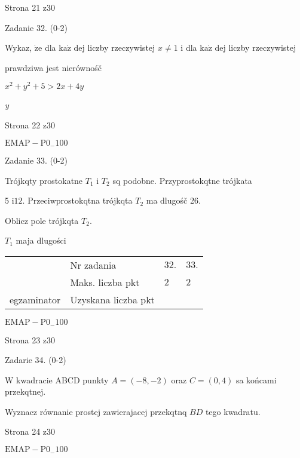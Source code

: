\documentclass[a4paper,12pt]{article}
\begin{document}
Strona 21 z30





Zadanie 32. (0-2)

Wykaz, $\dot{\mathrm{z}}\mathrm{e}$ dla $\mathrm{k}\mathrm{a}\dot{\mathrm{z}}$ dej liczby rzeczywistej $x\neq 1$ i dla $\mathrm{k}\mathrm{a}\dot{\mathrm{z}}$ dej liczby rzeczywistej

prawdziwa jest nierównośč

$x^{2}+y^{2}+5>2x+4y$

{\it y}

Strona 22 z30

$\mathrm{E}\mathrm{M}\mathrm{A}\mathrm{P}-\mathrm{P}0_{-}100$





Zadanie 33. (0-2)

Trójkqty prostokatne $T_{1}$ i $T_{2}$ sq podobne. Przyprostokqtne trójkata

5 $\mathrm{i} 12$. Przeciwprostokqtna trójkqta $T_{2}$ ma dlugośč 26.

Oblicz pole trójkqta $T_{2}.$

$T_{1}$ maja dlugości
\begin{center}
\begin{tabular}{|l|l|l|l|}
\cline{2-4}
&	\multicolumn{1}{|l|}{Nr zadania}&	\multicolumn{1}{|l|}{$32.$}&	\multicolumn{1}{|l|}{ $33.$}	\\
\cline{2-4}
&	\multicolumn{1}{|l|}{Maks. liczba pkt}&	\multicolumn{1}{|l|}{$2$}&	\multicolumn{1}{|l|}{ $2$}	\\
\cline{2-4}
\multicolumn{1}{|l|}{egzaminator}&	\multicolumn{1}{|l|}{Uzyskana liczba pkt}&	\multicolumn{1}{|l|}{}&	\multicolumn{1}{|l|}{}	\\
\hline
\end{tabular}

\end{center}
$\mathrm{E}\mathrm{M}\mathrm{A}\mathrm{P}-\mathrm{P}0_{-}100$

Strona 23 z30





Zadarie 34. (0-2)

$\mathrm{W}$ kwadracie ABCD punkty $A=(-8,-2)$ oraz $C=(0,4)$ sa końcami przekqtnej.

Wyznacz równanie prostej zawierajacej przekqtnq $BD$ tego kwadratu.

Strona 24 z30

$\mathrm{E}\mathrm{M}\mathrm{A}\mathrm{P}-\mathrm{P}0_{-}100$
\end{document}
